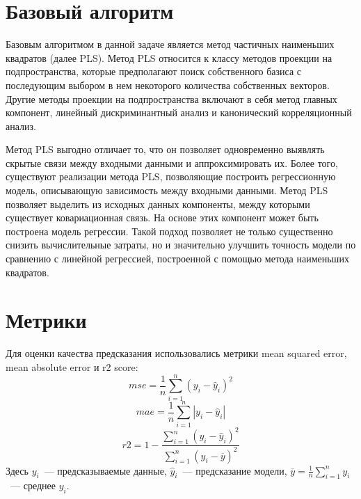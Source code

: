 \section{Базовый алгоритм}
Базовым алгоритмом в данной задаче является метод частичных наименьших квадратов (далее PLS).
Метод PLS относится к классу методов проекции на подпространства, которые предполагают поиск собственного базиса с последующим выбором в нем некоторого количества собственных векторов. Другие методы проекции на подпространства включают в себя метод главных компонент, линейный дискриминантный анализ и канонический корреляционный анализ. 

Метод PLS выгодно отличает то, что он позволяет одновременно выявлять скрытые связи между входными данными и аппроксимировать их. Более того, существуют реализации метода PLS, позволяющие построить регрессионную модель, описывающую зависимость между входными данными. 
Метод  PLS позволяет выделить из исходных данных компоненты, между которыми существует ковариационная связь. На основе этих компонент может быть построена модель регрессии. Такой подход позволяет не только существенно снизить вычислительные затраты, но и значительно улучшить точность модели по сравнению с линейной регрессией, построенной с помощью метода наименьших квадратов. 

\section{Метрики}
Для оценки качества предсказания использовались метрики mean squared error, mean absolute error и r2 score:
\[
  mse = \frac1n \sum_{i = 1}^n (y_i - \hat{y}_i)^2 \]\[
  mae = \frac1n \sum_{i = 1}^n |y_i - \hat{y}_i| \]\[
  r2 = 1 - \frac{\sum_{i = 1}^n (y_i - \hat{y}_i)^2}{\sum_{i = 1}^n (y_i - \overline{y})^2}
\]
Здесь $y_i$~--- предсказываемые данные, $\hat{y}_i$~--- предсказание модели, $\overline{y} = \frac1n \sum_{i = 1}^n y_i$~--- среднее $y_i$.

